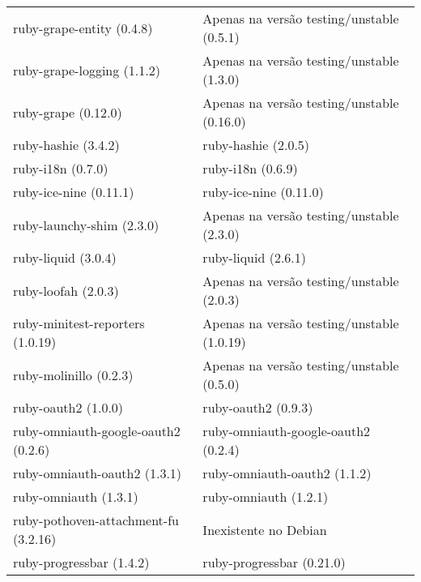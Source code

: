 \begin{table}[H]
\begin{tabular}{l|l}
        ruby-grape-entity (0.4.8)                        & Apenas na versão testing/unstable (0.5.1)  \\ 
        ruby-grape-logging (1.1.2)                       & Apenas na versão testing/unstable (1.3.0)  \\ 
        ruby-grape (0.12.0)                              & Apenas na versão testing/unstable (0.16.0) \\ 
        ruby-hashie (3.4.2)                              & ruby-hashie (2.0.5)                                               \\ 
        ruby-i18n (0.7.0)                                & ruby-i18n (0.6.9)                                                 \\ 
        ruby-ice-nine (0.11.1)                           & ruby-ice-nine (0.11.0)                                            \\ 
        ruby-launchy-shim (2.3.0)                        & Apenas na versão testing/unstable (2.3.0)  \\ 
        ruby-liquid (3.0.4)                              & ruby-liquid (2.6.1)                                               \\ 
        ruby-loofah (2.0.3)                              & Apenas na versão testing/unstable (2.0.3)  \\ 
        ruby-minitest-reporters (1.0.19)                 & Apenas na versão testing/unstable (1.0.19) \\ 
        ruby-molinillo (0.2.3)                           & Apenas na versão testing/unstable (0.5.0)  \\ 
        ruby-oauth2 (1.0.0)                              & ruby-oauth2 (0.9.3)                                               \\ 
        ruby-omniauth-google-oauth2 (0.2.6)              & ruby-omniauth-google-oauth2 (0.2.4)                               \\ 
        ruby-omniauth-oauth2 (1.3.1)                     & ruby-omniauth-oauth2 (1.1.2)                                      \\ 
        ruby-omniauth (1.3.1)                            & ruby-omniauth (1.2.1)                                             \\ 
        ruby-pothoven-attachment-fu (3.2.16)             & Inexistente no Debian                                             \\ 
        ruby-progressbar (1.4.2)                         & ruby-progressbar (0.21.0)                                         \\

\end{tabular}
\end{table}
